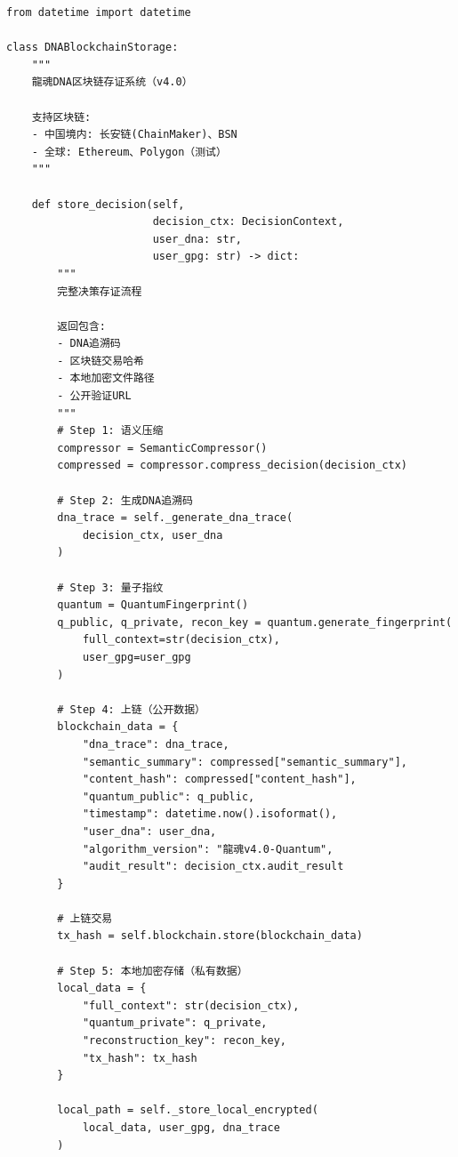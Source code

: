 \begin{lstlisting}[style=python,
  caption={区块链存证集成（v4.0新增）
    · DNA: \#龍芯⚡️2026-03-10-BLOCKCHAIN-v4.0},
  label={lst:blockchain}]
from datetime import datetime

class DNABlockchainStorage:
    """
    龍魂DNA区块链存证系统（v4.0）
    
    支持区块链:
    - 中国境内: 长安链(ChainMaker)、BSN
    - 全球: Ethereum、Polygon（测试）
    """
    
    def store_decision(self,
                       decision_ctx: DecisionContext,
                       user_dna: str,
                       user_gpg: str) -> dict:
        """
        完整决策存证流程
        
        返回包含:
        - DNA追溯码
        - 区块链交易哈希
        - 本地加密文件路径
        - 公开验证URL
        """
        # Step 1: 语义压缩
        compressor = SemanticCompressor()
        compressed = compressor.compress_decision(decision_ctx)
        
        # Step 2: 生成DNA追溯码
        dna_trace = self._generate_dna_trace(
            decision_ctx, user_dna
        )
        
        # Step 3: 量子指纹
        quantum = QuantumFingerprint()
        q_public, q_private, recon_key = quantum.generate_fingerprint(
            full_context=str(decision_ctx),
            user_gpg=user_gpg
        )
        
        # Step 4: 上链（公开数据）
        blockchain_data = {
            "dna_trace": dna_trace,
            "semantic_summary": compressed["semantic_summary"],
            "content_hash": compressed["content_hash"],
            "quantum_public": q_public,
            "timestamp": datetime.now().isoformat(),
            "user_dna": user_dna,
            "algorithm_version": "龍魂v4.0-Quantum",
            "audit_result": decision_ctx.audit_result
        }
        
        # 上链交易
        tx_hash = self.blockchain.store(blockchain_data)
        
        # Step 5: 本地加密存储（私有数据）
        local_data = {
            "full_context": str(decision_ctx),
            "quantum_private": q_private,
            "reconstruction_key": recon_key,
            "tx_hash": tx_hash
        }
        
        local_path = self._store_local_encrypted(
            local_data, user_gpg, dna_trace
        )
        

\end{lstlisting}
